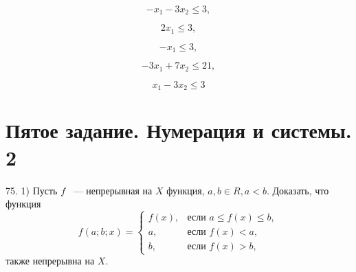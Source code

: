 \documentclass[a4paper,12pt]{article} %
\begin{document}
	\begin{equation}
		-x_1 - 3x_2 \leqslant 3,		
	\end{equation}

	\begin{equation}
		2x_1 \leqslant 3,		
	\end{equation}

	\begin{equation}
		-x_1 \leqslant 3,
	\end{equation}

	\begin{equation}
		-3x_1 + 7x_2 \leqslant 21,		
	\end{equation}

	\begin{equation}
		x_1 - 3x_2 \leqslant 3		
	\end{equation}
	
	\newpage
	\section{Пятое задание. Нумерация и системы. 2}
	75. 1) Пусть $f$ ~--- непрерывная на $X$ функция, $a, b \in R, a < b.$ Доказать, что функция
	\[
		f(a;b;x)=\begin{cases}
			f \left(x \right), &\text{если } a \leqslant f \left(x \right) \leqslant b, \\
		a, &\text{если } f \left(x \right) < a, \\
		b, &\text{если } f \left(x \right) > b,
		\end{cases}
	\]
	также непрерывна на $X.$
	
	\newpage
\end{document}
